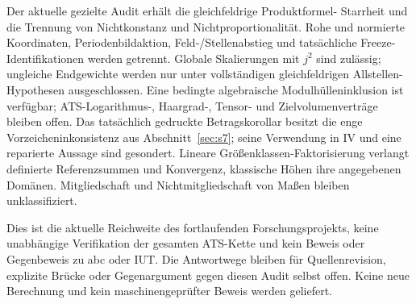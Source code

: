 \documentclass[11pt,a4paper]{article}
\theoremstyle{definition}
\theoremstyle{remark}
\begin{document}
Der aktuelle gezielte Audit erhält die gleichfeldrige Produktformel-
Starrheit und die Trennung von Nichtkonstanz und Nichtproportionalität.
Rohe und normierte Koordinaten, Periodenbildaktion, Feld-/Stellenabstieg
und tatsächliche Freeze-Identifikationen werden getrennt. Globale
Skalierungen mit $j^2$ sind zulässig; ungleiche Endgewichte werden nur unter
vollständigen gleichfeldrigen Allstellen-Hypothesen ausgeschlossen. Eine
bedingte algebraische Modulhülleninklusion ist verfügbar; ATS-Logarithmus-,
Haargrad-, Tensor- und Zielvolumenverträge bleiben offen. Das tatsächlich
gedruckte Betragskorollar besitzt die enge Vorzeicheninkonsistenz aus
Abschnitt~\ref{sec:s7}; seine Verwendung in IV und eine reparierte Aussage
sind gesondert. Lineare Größenklassen-Faktorisierung verlangt definierte
Referenzsummen und Konvergenz, klassische Höhen ihre angegebenen Domänen.
Mitgliedschaft und Nichtmitgliedschaft von Maßen bleiben unklassifiziert.

Dies ist die aktuelle Reichweite des fortlaufenden Forschungsprojekts,
keine unabhängige Verifikation der gesamten ATS-Kette und kein Beweis oder
Gegenbeweis zu abc oder IUT. Die Antwortwege bleiben für Quellenrevision,
explizite Brücke oder Gegenargument gegen diesen Audit selbst offen.
Keine neue Berechnung und kein maschinengeprüfter Beweis werden geliefert.


\end{document}
